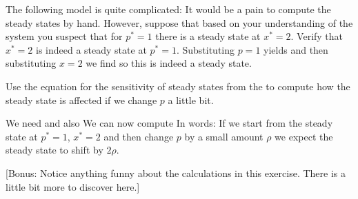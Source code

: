 


The following model is quite complicated:
It would be a pain to compute the steady states by hand. However, 
suppose that based on your understanding of the system you suspect that 
for $p^*=1$ there is a steady state at $x^*=2$. 
\subquestion
Verify that $x^*=2$ is indeed a steady state at $p^*=1$.
\solution
Substituting $p=1$ yields
and then substituting $x=2$ we find
so this is indeed a steady state. 

\subquestion
Use the equation for the sensitivity of steady states from the  to compute how the steady state is affected if we change $p$ a little bit. 

\solution
We need 
and also 
We can now compute 
In words: If we start from the steady state at $p^*=1$, $x^*=2$ and then change $p$ by a small amount $\rho$ we expect the steady state to shift by $2\rho$.

[Bonus: Notice anything funny about the calculations in this exercise. There is a little bit more to discover here.]
